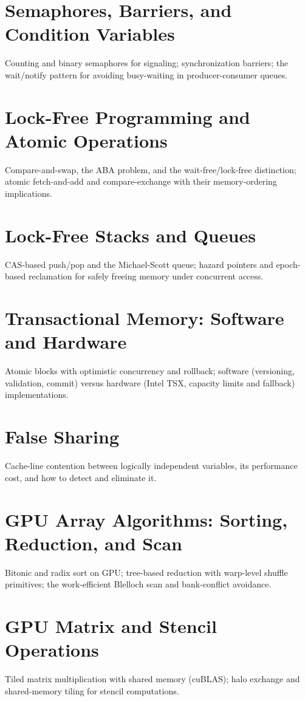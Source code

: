 \chapter{Semaphores, Barriers, and Condition Variables}
Counting and binary semaphores for signaling; synchronization barriers; the wait/notify pattern for avoiding busy-waiting in producer-consumer queues.

\chapter{Lock-Free Programming and Atomic Operations}
Compare-and-swap, the ABA problem, and the wait-free/lock-free distinction; atomic fetch-and-add and compare-exchange with their memory-ordering implications.

\chapter{Lock-Free Stacks and Queues}
CAS-based push/pop and the Michael-Scott queue; hazard pointers and epoch-based reclamation for safely freeing memory under concurrent access.

\chapter{Transactional Memory: Software and Hardware}
Atomic blocks with optimistic concurrency and rollback; software (versioning, validation, commit) versus hardware (Intel TSX, capacity limits and fallback) implementations.

\chapter{False Sharing}
Cache-line contention between logically independent variables, its performance cost, and how to detect and eliminate it.

\chapter{GPU Array Algorithms: Sorting, Reduction, and Scan}
Bitonic and radix sort on GPU; tree-based reduction with warp-level shuffle primitives; the work-efficient Blelloch scan and bank-conflict avoidance.

\chapter{GPU Matrix and Stencil Operations}
Tiled matrix multiplication with shared memory (cuBLAS); halo exchange and shared-memory tiling for stencil computations.

